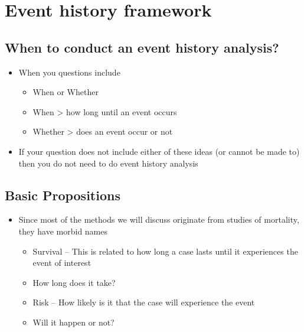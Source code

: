 \documentclass[
  letterpaper,
  DIV=11,
  numbers=noendperiod]{scrreprt}
\providecommand{\tightlist}{%
  \setlength{\itemsep}{0pt}\setlength{\parskip}{0pt}}\usepackage{longtable,booktabs,array}
\begin{document}
\hypertarget{event-history-framework}{%
\section{Event history framework}\label{event-history-framework}}

\hypertarget{when-to-conduct-an-event-history-analysis}{%
\subsection{When to conduct an event history
analysis?}\label{when-to-conduct-an-event-history-analysis}}

\begin{itemize}
\tightlist
\item
  When you questions include

  \begin{itemize}
  \tightlist
  \item
    When or Whether
  \item
    When \textgreater{} how long until an event occurs
  \item
    Whether \textgreater{} does an event occur or not
  \end{itemize}
\item
  If your question does not include either of these ideas (or cannot be
  made to) then you do not need to do event history analysis
\end{itemize}

\hypertarget{basic-propositions}{%
\subsection{Basic Propositions}\label{basic-propositions}}

\begin{itemize}
\tightlist
\item
  Since most of the methods we will discuss originate from studies of
  mortality, they have morbid names

  \begin{itemize}
  \tightlist
  \item
    Survival -- This is related to how long a case lasts until it
    experiences the event of interest
  \item
    How long does it take?
  \item
    Risk -- How likely is it that the case will experience the event
  \item
    Will it happen or not?
  \end{itemize}
\end{itemize}
\end{document}
